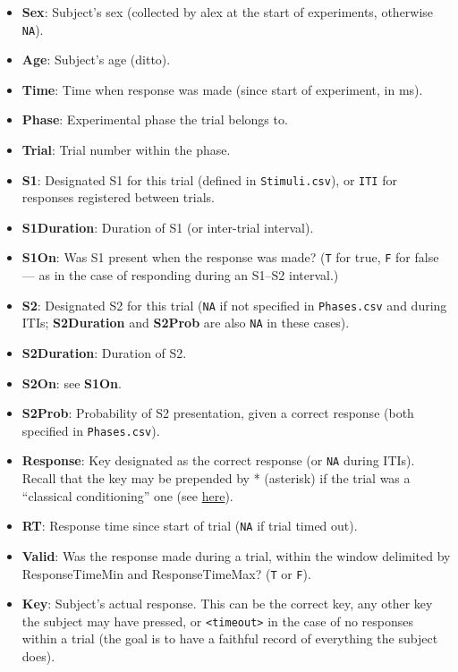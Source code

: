 \documentclass[11pt,]{article}
\begin{document}
\begin{itemize}
\item
  \textbf{Sex}: Subject's sex (collected by alex at the start of
  experiments, otherwise \texttt{NA}).
\item
  \textbf{Age}: Subject's age (ditto).
\item
  \textbf{Time}: Time when response was made (since start of experiment,
  in ms).
\item
  \textbf{Phase}: Experimental phase the trial belongs to.
\item
  \textbf{Trial}: Trial number within the phase.
\item
  \textbf{S1}: Designated S1 for this trial (defined in
  \texttt{Stimuli.csv}), or \texttt{ITI} for responses registered
  between trials.
\item
  \textbf{S1Duration}: Duration of S1 (or inter-trial interval).
\item
  \textbf{S1On}: Was S1 present when the response was made? (\texttt{T}
  for true, \texttt{F} for false --- as in the case of responding during
  an S1--S2 interval.)
\item
  \textbf{S2}: Designated S2 for this trial (\texttt{NA} if not
  specified in \texttt{Phases.csv} and during ITIs; \textbf{S2Duration}
  and \textbf{S2Prob} are also \texttt{NA} in these cases).
\item
  \textbf{S2Duration}: Duration of S2.
\item
  \textbf{S2On}: see \textbf{S1On}.
\item
  \textbf{S2Prob}: Probability of S2 presentation, given a correct
  response (both specified in \texttt{Phases.csv}).
\item
  \textbf{Response}: Key designated as the correct response (or
  \texttt{NA} during ITIs). Recall that the key may be prepended by *
  (asterisk) if the trial was a ``classical conditioning'' one (see
  \hyperref[responses]{here}).
\item
  \textbf{RT}: Response time since start of trial (\texttt{NA} if trial
  timed out).
\item
  \textbf{Valid}: Was the response made during a trial, within the
  window delimited by ResponseTimeMin and ResponseTimeMax? (\texttt{T}
  or \texttt{F}).
\item
  \textbf{Key}: Subject's actual response. This can be the correct key,
  any other key the subject may have pressed, or
  \texttt{\textless{}timeout\textgreater{}} in the case of no responses
  within a trial (the goal is to have a faithful record of everything
  the subject does).
\end{itemize}
\end{document}
